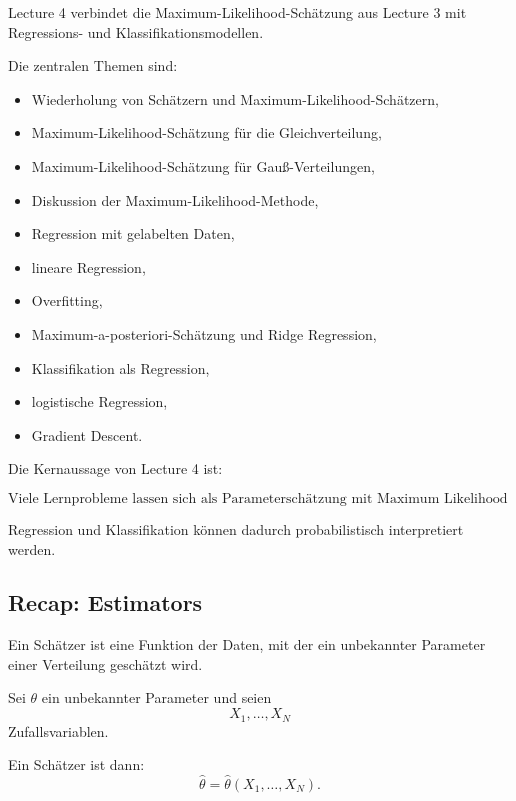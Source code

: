 \documentclass[11pt,a4paper]{scrartcl}
\begin{document}
\begin{notebox}
    Lecture 4 verbindet die Maximum-Likelihood-Schätzung aus Lecture 3 mit
    Regressions- und Klassifikationsmodellen.

    Die zentralen Themen sind:

    \begin{itemize}
        \item Wiederholung von Schätzern und Maximum-Likelihood-Schätzern,
        \item Maximum-Likelihood-Schätzung für die Gleichverteilung,
        \item Maximum-Likelihood-Schätzung für Gauß-Verteilungen,
        \item Diskussion der Maximum-Likelihood-Methode,
        \item Regression mit gelabelten Daten,
        \item lineare Regression,
        \item Overfitting,
        \item Maximum-a-posteriori-Schätzung und Ridge Regression,
        \item Klassifikation als Regression,
        \item logistische Regression,
        \item Gradient Descent.
    \end{itemize}
\end{notebox}

\begin{answerbox}
    Die Kernaussage von Lecture 4 ist:

    \[
        \boxed{
            \text{Viele Lernprobleme lassen sich als Parameterschätzung
            mit Maximum Likelihood oder MAP formulieren.}
        }
    \]

    Regression und Klassifikation können dadurch probabilistisch interpretiert
    werden.
\end{answerbox}

\subsection{Recap: Estimators}

\begin{notebox}
    Ein Schätzer ist eine Funktion der Daten, mit der ein unbekannter Parameter
    einer Verteilung geschätzt wird.

    Sei \(\theta\) ein unbekannter Parameter und seien
    \[
        X_1,\dots,X_N
    \]
    Zufallsvariablen.

    Ein Schätzer ist dann:
    \[
        \hat\theta
        =
        \hat\theta(X_1,\dots,X_N).
    \]
\end{notebox}
\end{document}
